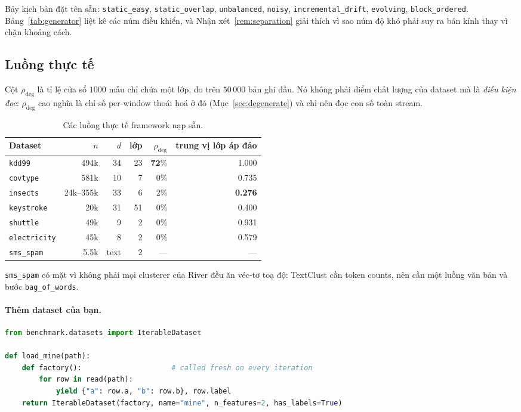 \documentclass[11pt,a4paper]{article}
\theoremstyle{remark}
\begin{document}
\noindent
Bảy kịch bản đặt tên sẵn: \texttt{static\_easy}, \texttt{static\_overlap},
\texttt{unbalanced}, \texttt{noisy}, \texttt{incremental\_drift},
\texttt{evolving}, \texttt{block\_ordered}. Bảng~\ref{tab:generator} liệt kê các
núm điều khiển, và Nhận xét~\ref{rem:separation} giải thích vì sao núm độ khó
phải suy ra bán kính thay vì chặn khoảng cách.

\subsection{Luồng thực tế}

Cột $\rho_{\text{deg}}$ là tỉ lệ cửa sổ $1000$ mẫu chỉ chứa một lớp, đo trên
$50\,000$ bản ghi đầu. Nó không phải điểm chất lượng của dataset mà là
\emph{điều kiện đọc}: $\rho_{\text{deg}}$ cao nghĩa là chỉ số per-window thoái
hoá ở đó (Mục~\ref{sec:degenerate}) và chỉ nên đọc con số toàn stream.

\begin{table}[htbp]
\centering
\small
\caption{Các luồng thực tế framework nạp sẵn.}
\label{tab:realdata}
\begin{tabular}{@{}lrrrrr@{}}
\toprule
\textbf{Dataset} & $n$ & $d$ & \textbf{lớp} & $\rho_{\text{deg}}$ & \textbf{trung vị lớp áp đảo} \\
\midrule
\texttt{kdd99} & 494k & 34 & 23 & $\mathbf{72\%}$ & 1.000 \\
\texttt{covtype} & 581k & 10 & 7 & $0\%$ & 0.735 \\
\texttt{insects} & 24k--355k & 33 & 6 & $2\%$ & \textbf{0.276} \\
\texttt{keystroke} & 20k & 31 & 51 & $0\%$ & 0.400 \\
\texttt{shuttle} & 49k & 9 & 2 & $0\%$ & 0.931 \\
\texttt{electricity} & 45k & 8 & 2 & $0\%$ & 0.579 \\
\texttt{sms\_spam} & 5.5k & text & 2 & --- & --- \\
\bottomrule
\end{tabular}
\end{table}

\texttt{sms\_spam} có mặt vì không phải mọi clusterer của River đều ăn véc-tơ toạ
độ: TextClust cần token counts, nên cần một luồng văn bản và bước
\texttt{bag\_of\_words}.

\paragraph{Thêm dataset của bạn.}
\begin{lstlisting}[language=Python]
from benchmark.datasets import IterableDataset

def load_mine(path):
    def factory():                     # called fresh on every iteration
        for row in read(path):
            yield {"a": row.a, "b": row.b}, row.label
    return IterableDataset(factory, name="mine", n_features=2, has_labels=True)
\end{lstlisting}
\end{document}

